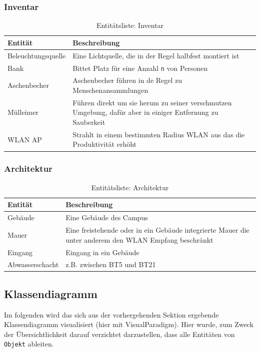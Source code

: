 \documentclass[10pt]{scrartcl}
\begin{document}
\clearpage

\subsubsection{Inventar}	

\begin{table}[!htb]	
	\centering
\begin{longtable}{|p{}|p{}|}
\hline \textbf{Entität} & \textbf{Beschreibung} \\
\hline
\hline Beleuchtungsquelle & Eine Lichtquelle, die in der Regel halbfest montiert ist \\ 
\hline Bank & Bittet Platz für eine Anzahl \verb!n! von Personen \\ 
\hline Aschenbecher & Aschenbecher führen in de Regel zu Menschenansammlungen \\ 
\hline Mülleimer & Führen direkt um sie herum zu seiner verschmutzen Umgebung, dafür aber in einiger Entfernung zu Sauberkeit\\ 
\hline WLAN AP & Strahlt in einem bestimmten Radius WLAN aus das die Produktivität erhöht\\ 
\hline 
\end{longtable}
	\label{tab:entitiesInventory}
	\caption{Entitätsliste: Inventar}	
\end{table}	

\subsubsection{Architektur}

\begin{table}[!htb]	
	\centering
\begin{longtable}{|p{}|p{}|}
\hline \textbf{Entität} & \textbf{Beschreibung} \\
\hline	
\hline Gebäude & Eine Gebäude des Campus\\ 
\hline Mauer & Eine freistehende oder in ein Gebäude integrierte Mauer die unter anderem den WLAN Empfang beschränkt\\ 
\hline Eingang & Eingang in ein Gebäude \\ 
\hline Abwasserschacht & z.B. zwischen BT5 und BT21 \\ 
\hline 
\end{longtable}
	\label{tab:entitiesArchitecture}
	\caption{Entitätsliste: Architektur}	
\end{table}	

	\subsection{Klassendiagramm}
	Im folgenden wird das sich aus der vorhergehenden Sektion ergebende Klassendiagramm visualisiert (hier mit VisualParadigm).
	Hier wurde, zum Zweck der Übersichtlichkeit darauf verzichtet darzustellen, dass alle Entitäten von \verb!Objekt! ableiten.
	
\end{document}
